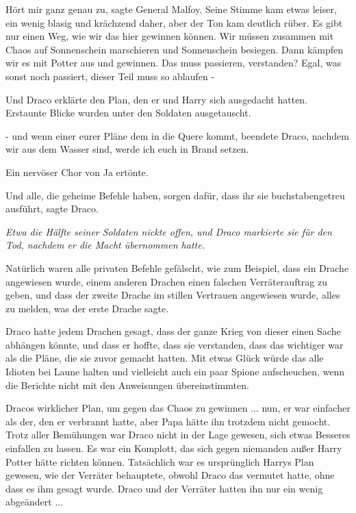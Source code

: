 \glqq{}Hört mir ganz genau zu\grqq{}, sagte General Malfoy. Seine Stimme kam
etwas leiser, ein wenig blasig und krächzend daher, aber der Ton kam deutlich
rüber. \glqq{}Es gibt nur einen Weg, wie wir das hier gewinnen können. Wir müssen
zusammen mit Chaos auf Sonnenschein marschieren und Sonnenschein besiegen. Dann
kämpfen wir es mit Potter aus und gewinnen. Das muss passieren, verstanden?
Egal, was sonst noch passiert, dieser Teil muss so ablaufen -\grqq{}

Und Draco erklärte den Plan, den er und Harry sich ausgedacht hatten. Erstaunte
Blicke wurden unter den Soldaten ausgetauscht.

\glqq{}- und wenn einer eurer Pläne dem in die Quere kommt\grqq{}, beendete
Draco, \glqq{}nachdem wir aus dem Wasser sind, werde ich euch in Brand setzen.\grqq{}

Ein nervöser Chor von \glqq{}Ja\grqq{} ertönte.

\glqq{}Und alle, die geheime Befehle haben, sorgen dafür, dass ihr sie
buchstabengetreu ausführt\grqq{}, sagte Draco.

\emph{Etwa die Hälfte seiner Soldaten nickte offen, und Draco markierte sie für
den Tod, nachdem er die Macht übernommen hatte.}

Natürlich waren alle privaten Befehle gefälscht, wie zum Beispiel, dass ein
Drache angewiesen wurde, einem anderen Drachen einen falschen Verräterauftrag zu
geben, und dass der zweite Drache im stillen Vertrauen angewiesen wurde, alles
zu melden, was der erste Drache sagte.

Draco hatte jedem Drachen gesagt, dass der ganze Krieg von dieser einen Sache
abhängen könnte, und dass er hoffte, dass sie verstanden, dass das wichtiger war
als die Pläne, die sie zuvor gemacht hatten. Mit etwas Glück würde das alle
Idioten bei Laune halten und vielleicht auch ein paar Spione aufscheuchen, wenn
die Berichte nicht mit den Anweisungen übereinstimmten.

Dracos wirklicher Plan, um gegen das Chaos zu gewinnen ... nun, er war einfacher
als der, den er verbrannt hatte, aber Papa hätte ihn trotzdem nicht gemocht.
Trotz aller Bemühungen war Draco nicht in der Lage gewesen, sich etwas Besseres
einfallen zu lassen. Es war ein Komplott, das sich gegen niemanden außer Harry
Potter hätte richten können. Tatsächlich war es ursprünglich Harrys Plan
gewesen, wie der Verräter behauptete, obwohl Draco das vermutet hatte, ohne dass
es ihm gesagt wurde. Draco und der Verräter hatten ihn nur ein wenig
abgeändert ...

